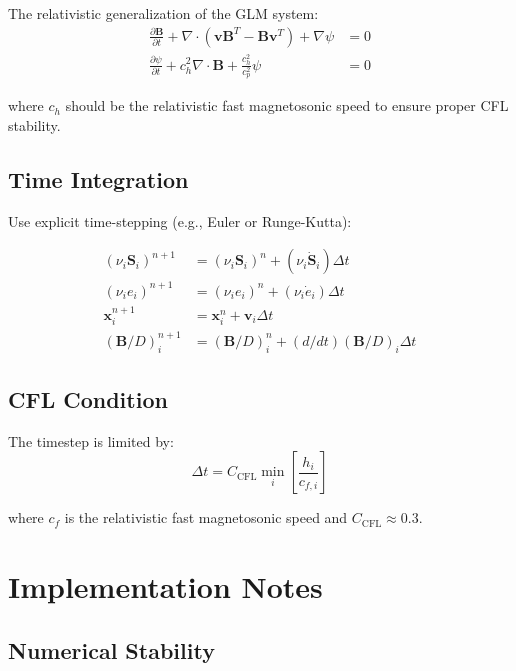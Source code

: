 \documentclass[12pt,a4paper]{article}
\begin{document}
The relativistic generalization of the GLM system:
\begin{align}
\frac{\partial \bm{B}}{\partial t} + \nabla \cdot (\bm{v}\bm{B}^T - \bm{B}\bm{v}^T) + \nabla\psi &= 0 \\
\frac{\partial \psi}{\partial t} + c_h^2 \nabla \cdot \bm{B} + \frac{c_h^2}{c_p^2}\psi &= 0
\end{align}

where $c_h$ should be the relativistic fast magnetosonic speed to ensure proper
CFL stability.

\subsection{Time Integration}

Use explicit time-stepping (e.g., Euler or Runge-Kutta):

\begin{align}
(\nu_i \bm{S}_i)^{n+1} &= (\nu_i \bm{S}_i)^n + (\nu_i \dot{\bm{S}}_i) \Delta t \\
(\nu_i e_i)^{n+1} &= (\nu_i e_i)^n + (\nu_i \dot{e}_i) \Delta t \\
\bm{x}_i^{n+1} &= \bm{x}_i^n + \bm{v}_i \Delta t \\
(\bm{B}/D)_i^{n+1} &= (\bm{B}/D)_i^n + (d/dt)(\bm{B}/D)_i \Delta t
\end{align}

\subsection{CFL Condition}

The timestep is limited by:
\begin{equation}
\Delta t = C_\text{CFL} \min_i \left[\frac{h_i}{c_{f,i}}\right]
\label{eq:cfl}
\end{equation}

where $c_f$ is the relativistic fast magnetosonic speed and $C_\text{CFL} \approx 0.3$.

\section{Implementation Notes}

\subsection{Numerical Stability}
\end{document}
